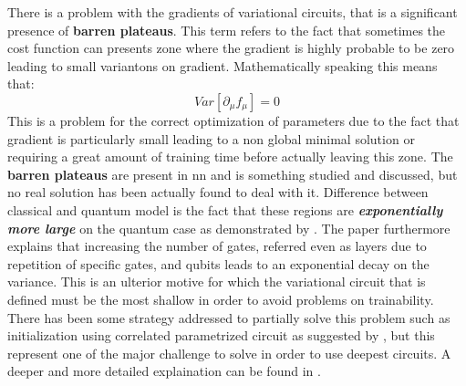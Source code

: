 There is a problem with the gradients of variational circuits, that is a significant presence of \textbf{barren plateaus}. This term refers to the fact that sometimes the cost function can presents zone where the gradient is highly probable to be zero leading to small variantons on gradient. Mathematically speaking this means that:
\begin{equation}\label{barren plateau}
	Var[\partial_\mu f_\mu] = 0
\end{equation} 
This is a problem for the correct optimization of parameters due to the fact that gradient is particularly small leading to a non global minimal solution or requiring a great amount of training time before actually leaving this zone. The \textbf{barren plateaus} are present in \acrlong{nn} and is something studied and discussed, but no real solution has been actually found to deal with it.
Difference between classical and quantum model is the fact that these regions are \textbf{\textit{exponentially more large}} on the quantum case as demonstrated by \cite{McClean_2018}. The paper furthermore explains that increasing the number of gates, referred even as layers due to repetition of specific gates, and qubits leads to an exponential decay on the variance. This is an ulterior motive for which the variational circuit that is defined must be the most shallow in order to avoid problems on trainability. There has been some strategy addressed to partially solve this problem such as initialization using correlated parametrized circuit as suggested by \cite{Grant_2019}, but this represent one of the major challenge to solve in order to use deepest circuits. A deeper and more detailed explaination can be found in \cite{Schuld2021vqa}.
